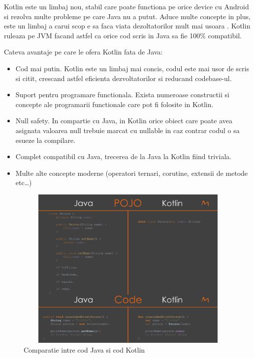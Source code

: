 \documentclass[12pt]{article}
\begin{document}
Kotlin este un limbaj nou, stabil care poate functiona pe orice device cu Android si rezolva multe
probleme pe care Java nu a putut. Aduce multe concepte in plus, este un limbaj a carui scop e sa faca
viata dezoltatorilor mult mai usoara \cite{moskala2017android}. Kotlin ruleaza pe JVM facand astfel ca orice cod scris in Java sa fie 100\% compatibil.

Cateva avantaje pe care le ofera Kotlin fata de Java:
\begin{itemize}
    \item Cod mai putin. Kotlin este un limbaj mai concis, codul este mai usor de scris
    si citit, crescand astfel eficienta dezvoltatorilor si reducand codebase-ul.
    \item Suport pentru programare functionala. Exista numeroase constructii si concepte
    ale programarii functionale care pot fi folosite in Kotlin.
    \item Null safety. In compartie cu Java, in Kotlin orice obiect care poate avea asignata 
    valoarea null trebuie marcat cu nullable in caz contrar codul o sa esueze la compilare.
    \item Complet compatibil cu Java, trecerea de la Java la Kotlin fiind triviala.
    \item Multe alte concepte moderne (operatori ternari, corutine, extensii de metode etc\dots)
    
\end{itemize}


\begin{figure}[H]
    \centering
    \includegraphics[width=12cm, height=8cm]{kotvsjava.png}
    \caption{Comparatie intre cod Java si cod Kotlin \cite{kotlinvsjava}}
    \end{figure}
    
\end{document}
